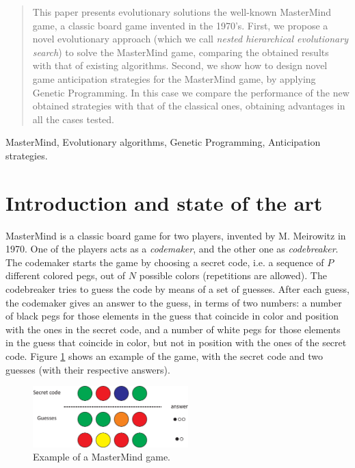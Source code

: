 %
\date{Received: date / Revised version: date}
%
\maketitle
%
\begin{abstract}
This paper presents evolutionary solutions the well-known MasterMind
game, a classic board game invented in the 1970's. First, we propose a
novel evolutionary approach (which we call {\em nested hierarchical evolutionary search}) to solve the MasterMind game, comparing the obtained
results with that of existing algorithms. Second, we show how to design novel game anticipation strategies for the MasterMind game, by
applying  Genetic Programming. In this case we compare the performance of the new obtained strategies with
that of the classical ones, obtaining advantages in all the cases tested.
\end{abstract}
%
\begin{keywords}
MasterMind, Evolutionary algorithms, Genetic Programming, Anticipation strategies.
\end{keywords}

\section{Introduction and state of the art}

MasterMind is a classic board game for two players, invented by
M. Meirowitz in 1970. One of the players acts as a {\em codemaker},
and the other one as {\em codebreaker}. The codemaker starts the game
by choosing a secret code, i.e. a sequence of $P$ different colored pegs, out of $N$ possible colors (repetitions are allowed). The
codebreaker tries to guess the code by means of a set of
guesses. After each guess, the codemaker gives an answer to the guess,
in terms of two numbers: a number of black pegs for those elements in
the guess that coincide in color and position with the ones in the
secret code, and a number of  white pegs for those elements in the
guess that coincide in color, but not in position with the ones of the
secret code. Figure \ref{Game_Mastermind} shows an example of the game,
with the secret code and two guesses (with their respective answers).


\begin{figure}[!ht]
\begin{center}
\includegraphics[draft=false,angle=0,width=6cm]{./Ejemplo_juego.eps}
\end{center}
\caption{\label{Game_Mastermind} Example of a MasterMind game.}
\end{figure}

